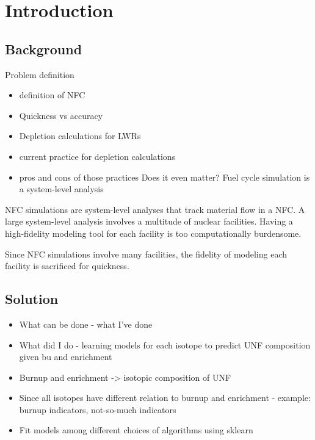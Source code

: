 \section{Introduction}
\subsection{Background}
Problem definition
\begin{itemize}
    \item definition of NFC
    \item Quickness vs accuracy
    \item Depletion calculations for LWRs
    \item current practice for depletion calculations
    \item pros and cons of those practices
    \itme Does it even matter? Fuel cycle simulation is a system-level analysis
\end{itemize}

\gls{NFC} simulations are system-level analyses that track
material flow in a \gls{NFC}. A large system-level analysis
involves a multitude of nuclear facilities. Having a high-fidelity
modeling tool for each facility is too computationally burdensome.









Since \gls{NFC} simulations 
involve many facilities, the fidelity of modeling each
facility is sacrificed for quickness. 



\subsection{Solution}
\begin{itemize}
    \item What can be done - what I've done
    \item What did I do - learning models for each isotope to predict UNF composition given bu and enrichment
    \item Burnup and enrichment -> isotopic composition of UNF
    \item Since all isotopes have different relation to burnup and enrichment
            - example: burnup indicators, not-so-much indicators
    \item Fit models among different choices of algorithms using sklearn
\end{itemize}